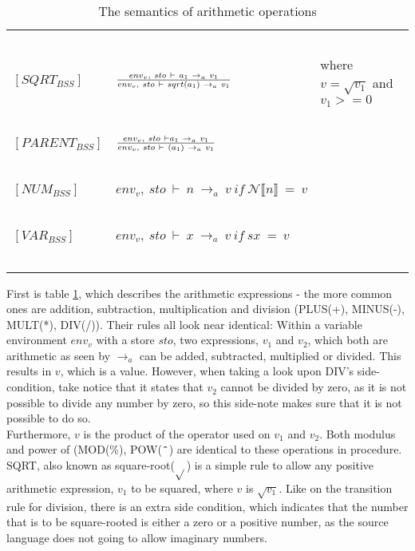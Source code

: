 \begin{table}[H]
\begin{tabular}{|l|l|l|}
			~			&															~																			& ~ \\
	$[SQRT_{BSS}]$		& $env_{v},~sto~\vdash~a_{1}~\rightarrow_{a}~v_{1} \over env_{v},~sto~\vdash~sqrt(a_{1})~\rightarrow_{a}~v_{1}$												& where $v = \sqrt{v_{1}}$ and $v_1 >= 0$ \\
			~			&															~																			& ~ \\
	$[PARENT_{BSS}]$	& $env_{v},~sto~\vdash a_{1}~\rightarrow_{a}~v_{1} \over env_{v},~sto~\vdash~(a_{1})~\rightarrow_{a}~v_{1}$													& ~ \\
			~			&															~																			& ~ \\
	$[NUM_{BSS}]$		& $env_{v},~sto~\vdash~n~\rightarrow_{a}~v~ if ~\mathcal{N}\llbracket n \rrbracket~=~v$															& ~ \\
			~			&															~																			& ~ \\
	$[VAR_{BSS}]$		& $env_{v},~sto~\vdash~x~\rightarrow_{a}~v~if~sx~=~v$														   									& ~ \\
			~			&															~																			& ~ \\
	\hline
	\end{tabular}
	\label{tab:semantics_aritmethic}
	\caption{The semantics of arithmetic operations}
\end{table}

First is table \ref{tab:semantics_aritmethic}, which describes the arithmetic expressions - the more common ones are addition, subtraction, multiplication and division (PLUS(+), MINUS(-), MULT(*), DIV(/)). Their rules all look near identical: Within a variable environment $env_{v}$ with a store $sto$, two expressions, $v_{1}$ and $v_{2}$, which both are arithmetic as seen by $\rightarrow_{a}$ can be added, subtracted, multiplied or divided. This results in $v$, which is a value. However, when taking a look upon DIV's side-condition, take notice that it states that $v_{2}$ cannot be divided by zero, as it is not possible to divide any number by zero, so this side-note makes sure that it is not possible to do so. \\
Furthermore, $v$ is the product of the operator used on $v_{1}$ and $v_{2}$. Both modulus and power of (MOD(\%), POW($\texttt{\^{}}$) are identical to these operations in procedure. \\
SQRT, also known as square-root($\sqrt{}$) is a simple rule to allow any positive arithmetic expression, $v_{1}$ to be squared, where $v$ is $\sqrt{v_{1}}$. Like on the transition rule for division, there is an extra side condition, which indicates that the number that is to be square-rooted is either a zero or a positive number, as the source language does not going to allow imaginary numbers. \\

